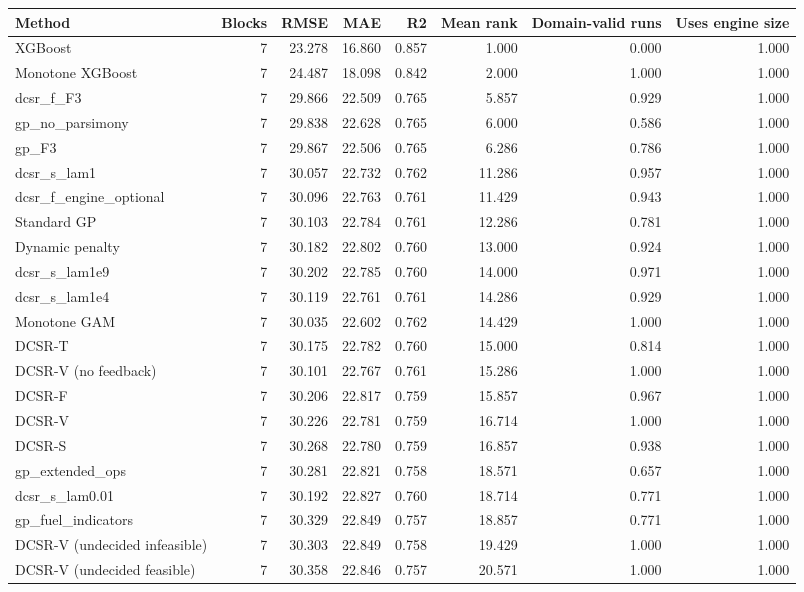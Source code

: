 \begin{tabular}{lrrrrrrr}
\toprule
Method & Blocks & RMSE & MAE & R2 & Mean rank & Domain-valid runs & Uses engine size \\
\midrule
XGBoost & 7 & 23.278 & 16.860 & 0.857 & 1.000 & 0.000 & 1.000 \\
Monotone XGBoost & 7 & 24.487 & 18.098 & 0.842 & 2.000 & 1.000 & 1.000 \\
dcsr\_f\_F3 & 7 & 29.866 & 22.509 & 0.765 & 5.857 & 0.929 & 1.000 \\
gp\_no\_parsimony & 7 & 29.838 & 22.628 & 0.765 & 6.000 & 0.586 & 1.000 \\
gp\_F3 & 7 & 29.867 & 22.506 & 0.765 & 6.286 & 0.786 & 1.000 \\
dcsr\_s\_lam1 & 7 & 30.057 & 22.732 & 0.762 & 11.286 & 0.957 & 1.000 \\
dcsr\_f\_engine\_optional & 7 & 30.096 & 22.763 & 0.761 & 11.429 & 0.943 & 1.000 \\
Standard GP & 7 & 30.103 & 22.784 & 0.761 & 12.286 & 0.781 & 1.000 \\
Dynamic penalty & 7 & 30.182 & 22.802 & 0.760 & 13.000 & 0.924 & 1.000 \\
dcsr\_s\_lam1e9 & 7 & 30.202 & 22.785 & 0.760 & 14.000 & 0.971 & 1.000 \\
dcsr\_s\_lam1e4 & 7 & 30.119 & 22.761 & 0.761 & 14.286 & 0.929 & 1.000 \\
Monotone GAM & 7 & 30.035 & 22.602 & 0.762 & 14.429 & 1.000 & 1.000 \\
DCSR-T & 7 & 30.175 & 22.782 & 0.760 & 15.000 & 0.814 & 1.000 \\
DCSR-V (no feedback) & 7 & 30.101 & 22.767 & 0.761 & 15.286 & 1.000 & 1.000 \\
DCSR-F & 7 & 30.206 & 22.817 & 0.759 & 15.857 & 0.967 & 1.000 \\
DCSR-V & 7 & 30.226 & 22.781 & 0.759 & 16.714 & 1.000 & 1.000 \\
DCSR-S & 7 & 30.268 & 22.780 & 0.759 & 16.857 & 0.938 & 1.000 \\
gp\_extended\_ops & 7 & 30.281 & 22.821 & 0.758 & 18.571 & 0.657 & 1.000 \\
dcsr\_s\_lam0.01 & 7 & 30.192 & 22.827 & 0.760 & 18.714 & 0.771 & 1.000 \\
gp\_fuel\_indicators & 7 & 30.329 & 22.849 & 0.757 & 18.857 & 0.771 & 1.000 \\
DCSR-V (undecided infeasible) & 7 & 30.303 & 22.849 & 0.758 & 19.429 & 1.000 & 1.000 \\
DCSR-V (undecided feasible) & 7 & 30.358 & 22.846 & 0.757 & 20.571 & 1.000 & 1.000 \\

\end{tabular}
